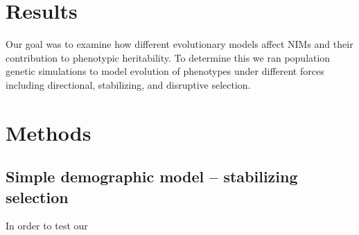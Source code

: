 \section{Results}
Our goal was to examine how different evolutionary models affect NIMs and their contribution to phenotypic heritability. To determine this we ran population genetic simulations to model evolution of phenotypes under different forces including directional, stabilizing, and disruptive selection. 
\section{Methods}
\subsection{Simple demographic model – stabilizing selection}
In order to test our 

